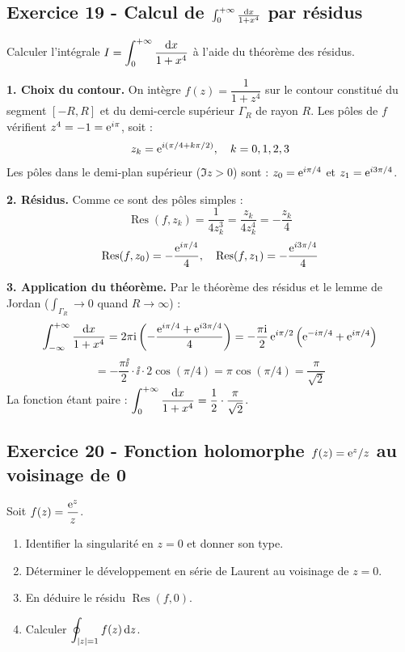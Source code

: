 \documentclass[12pt,a4paper]{article}
\begin{document}
\subsection*{Exercice 19 - Calcul de $\int_0^{+\infty}\frac{\mathrm{d} x}{1+x^4}$ par résidus \niveau{\difficile}}

\begin{boiteexercice}
Calculer l'intégrale $I = \displaystyle\int_0^{+\infty}\frac{\mathrm{d} x}{1+x^4}$ à l'aide du théorème des résidus.
\end{boiteexercice}

\begin{boitecorrige}
\textbf{1. Choix du contour.} On intègre $f(z) = \dfrac{1}{1+z^4}$ sur le contour constitué du segment $[-R, R]$ et du demi-cercle supérieur $\Gamma_R$ de rayon $R$. Les pôles de $f$ vérifient $z^4 = -1 = \mathrm{e}^{i\pi}$, soit :
\[
z_k = \mathrm{e}^{i(\pi/4 + k\pi/2)},\quad k=0,1,2,3
\]
Les pôles dans le demi-plan supérieur ($\Im z > 0$) sont : $z_0 = \mathrm{e}^{i\pi/4}$ et $z_1 = \mathrm{e}^{i3\pi/4}$.

\textbf{2. Résidus.} Comme ce sont des pôles simples :
\[
\operatorname{Res}(f, z_k) = \frac{1}{4z_k^3} = \frac{z_k}{4z_k^4} = -\frac{z_k}{4}
\]
\[
\operatorname{Res}(f, z_0) = -\frac{\mathrm{e}^{i\pi/4}}{4}, \quad \operatorname{Res}(f, z_1) = -\frac{\mathrm{e}^{i3\pi/4}}{4}
\]

\textbf{3. Application du théorème.} Par le théorème des résidus et le lemme de Jordan ($\int_{\Gamma_R}\to 0$ quand $R\to\infty$) :
\[
\int_{-\infty}^{+\infty}\frac{\mathrm{d} x}{1+x^4} = 2\pi\mathrm{i}\left(-\frac{\mathrm{e}^{i\pi/4}+\mathrm{e}^{i3\pi/4}}{4}\right) = -\frac{\pi\mathrm{i}}{2}\,\mathrm{e}^{i\pi/2}\left(\mathrm{e}^{-i\pi/4}+\mathrm{e}^{i\pi/4}\right)
\]
\[
= -\frac{\pi\ii}{2}\cdot\ii\cdot 2\cos(\pi/4) = \pi\cos(\pi/4) = \frac{\pi}{\sqrt{2}}
\]
La fonction étant paire : $\displaystyle\int_0^{+\infty}\frac{\mathrm{d} x}{1+x^4} = \frac{1}{2}\cdot\frac{\pi}{\sqrt{2}}$.

\end{boitecorrige}

\subsection*{Exercice 20 - Fonction holomorphe $f(z)=\mathrm{e}^z/z$ au voisinage de 0 \niveau{\moyen}}

\begin{boiteexercice}
Soit $f(z) = \dfrac{\mathrm{e}^z}{z}$.
\begin{enumerate}
  \item Identifier la singularité en $z=0$ et donner son type.
  \item Déterminer le développement en série de Laurent au voisinage de $z=0$.
  \item En déduire le résidu $\operatorname{Res}(f, 0)$.
  \item Calculer $\displaystyle\oint_{|z|=1} f(z)\,\mathrm{d} z$.
\end{enumerate}
\end{boiteexercice}
\end{document}
